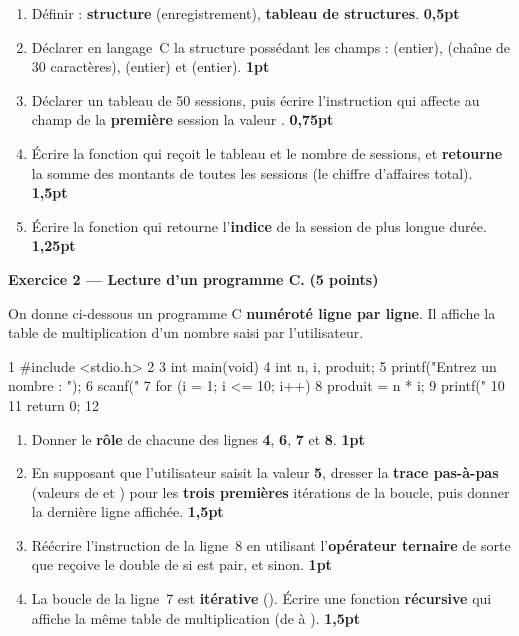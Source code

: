 \begin{enumerate}[label=\textbf{\arabic*-},leftmargin=2.2em]
\item Définir : \textbf{structure} (enregistrement), \textbf{tableau de
structures}. \hfill \textbf{0,5pt}
\item Déclarer en langage~C la structure  possédant les champs :
 (entier),  (chaîne de 30 caractères), 
(entier) et  (entier). \hfill \textbf{1pt}
\item Déclarer un tableau  de 50 sessions, puis écrire l'instruction qui
affecte au champ  de la \textbf{première} session la valeur
. \hfill \textbf{0,75pt}
\item Écrire la fonction  qui reçoit
le tableau et le nombre  de sessions, et \textbf{retourne} la somme des
montants de toutes les sessions (le chiffre d'affaires total). \hfill \textbf{1,5pt}
\item Écrire la fonction  qui
retourne l'\textbf{indice} de la session de plus longue durée. \hfill \textbf{1,25pt}
\end{enumerate}

\bigskip
\textbf{Exercice 2 — Lecture d'un programme C.} \hfill \textbf{(5 points)}

\smallskip
On donne ci-dessous un programme C \textbf{numéroté ligne par ligne}. Il affiche la
table de multiplication d'un nombre saisi par l'utilisateur.

\begin{codec}
1   #include <stdio.h>
2
3   int main(void) {
4       int n, i, produit;
5       printf("Entrez un nombre : ");
6       scanf("%
7       for (i = 1; i <= 10; i++) {
8           produit = n * i;
9           printf("%
10      }
11      return 0;
12  }
\end{codec}

\begin{enumerate}[label=\textbf{\arabic*-},leftmargin=2.2em]
\item Donner le \textbf{rôle} de chacune des lignes \textbf{4}, \textbf{6},
\textbf{7} et \textbf{8}. \hfill \textbf{1pt}
\item En supposant que l'utilisateur saisit la valeur \textbf{5}, dresser la
\textbf{trace pas-à-pas} (valeurs de  et ) pour les
\textbf{trois premières} itérations de la boucle, puis donner la dernière ligne
affichée. \hfill \textbf{1,5pt}
\item Réécrire l'instruction de la ligne~8 en utilisant l'\textbf{opérateur
ternaire} de sorte que  reçoive le double de  si 
est pair, et  sinon. \hfill \textbf{1pt}
\item La boucle de la ligne~7 est \textbf{itérative} (). Écrire une
fonction \textbf{récursive}  qui affiche la même
table de multiplication (de  à ). \hfill \textbf{1,5pt}
\end{enumerate}

